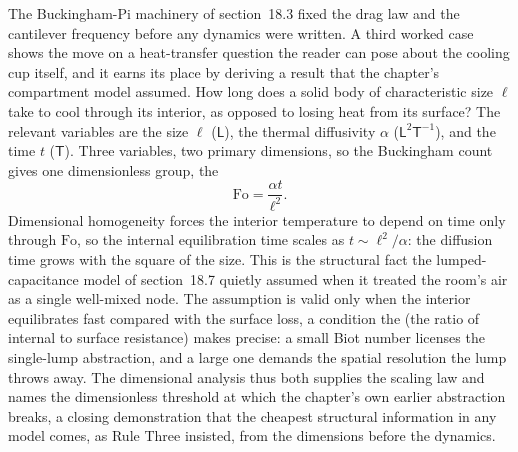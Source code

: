 The Buckingham-Pi machinery of section~18.3 fixed the drag law and the
cantilever frequency before any dynamics were written. A third worked case
shows the move on a heat-transfer question the reader can pose about the
cooling cup itself, and it earns its place by deriving a result that the
chapter's compartment model assumed. How long does a solid body of
characteristic size $\ell$ take to cool through its interior, as opposed to
losing heat from its surface? The relevant variables are the size $\ell$
($\mathsf{L}$), the thermal diffusivity $\alpha$
($\mathsf{L}^2\mathsf{T}^{-1}$), and the time $t$ ($\mathsf{T}$). Three
variables, two primary dimensions, so the Buckingham count gives one
dimensionless group, the 
\[
\mathrm{Fo} = \frac{\alpha t}{\ell^2}.
\]
Dimensional homogeneity forces the interior temperature to depend on time
only through $\mathrm{Fo}$, so the internal equilibration time scales as
$t \sim \ell^2/\alpha$: the diffusion time grows with the square of the
size. This is the structural fact the lumped-capacitance model of
section~18.7 quietly assumed when it treated the room's air as a single
well-mixed node. The assumption is valid only when the interior
equilibrates fast compared with the surface loss, a condition the
 (the ratio of internal to surface resistance) makes
precise: a small Biot number licenses the single-lump abstraction, and a
large one demands the spatial resolution the lump throws away. The
dimensional analysis thus both supplies the scaling law and names the
dimensionless threshold at which the chapter's own earlier abstraction
breaks, a closing demonstration that the cheapest structural information in
any model comes, as Rule Three insisted, from the dimensions before the
dynamics.

